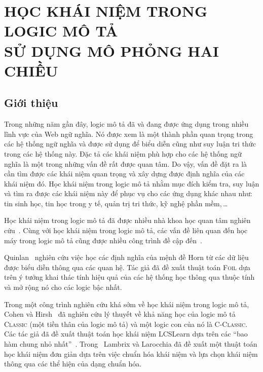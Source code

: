 \chapter[Học khái niệm trong logic mô tả sử dụng mô phỏng hai~chiều]{HỌC KHÁI NIỆM TRONG LOGIC MÔ TẢ\\SỬ DỤNG MÔ PHỎNG HAI CHIỀU} 
\label{Chapter3}
\thispagestyle{fancy}

\section{Giới thiệu}
\label{sec:Chap3.Introduction}
Trong những năm gần đây, logic mô tả đã và đang được ứng dụng trong nhiều lĩnh vực của Web ngữ nghĩa. Nó được xem là một thành phần quan trọng trong các hệ thống ngữ nghĩa và được sử dụng để biểu diễn cũng như suy luận tri thức trong các hệ thống này. Đặc tả các khái niệm phù hợp cho các hệ thống ngữ nghĩa là một trong những vấn đề rất được quan tâm. Do vậy, vấn đề đặt ra là cần tìm được các khái niệm quan trọng và xây dựng được định nghĩa của các khái niệm đó. Học khái niệm trong logic mô tả nhằm mục đích kiểm tra, suy luận và tìm ra được các khái niệm này để phục vụ cho các ứng dụng khác nhau như: tin sinh học, tin học trong y tế, quản trị tri thức, kỹ nghệ phần mềm,\,\ldots

Học khái niệm trong logic mô tả đã được nhiều nhà khoa học quan tâm nghiên cứu~\cite{Quinlan1990,Cohen1994,Lambrix1998,Badea2000,Iannone2007,Fanizzi2004,Fanizzi2008,Lehmann2007,Fanizzi2010,Lehmann2010,Nguyen2013}. Cùng với học khái niệm trong logic mô tả, các vấn đề liên quan đến học máy trong logic mô tả cũng được nhiều công trình đề cập đến~\cite{Alvarez2000,Kietz2003,Revoredo2010,Konstantopoulos2010,Distel2011,Lisi2012,Lisi2012B,Lisi2013,Ma2013}.

Quinlan~\cite{Quinlan1990} nghiên cứu việc học các định nghĩa của mệnh đề Horn từ các dữ liệu được biểu diễn thông qua các quan hệ. Tác giả đã đề xuất thuật toán \textsc{Foil} dựa trên ý tưởng khai thác tính hiệu quả của các hệ thống học thông qua thuộc tính và mở rộng nó cho các logic bậc nhất.

Trong một công trình nghiên cứu khá sớm về học khái niệm trong logic mô tả, Cohen và Hirsh~\cite{Cohen1994} đã nghiên cứu lý thuyết về khả năng học của logic mô tả \textsc{Classic} (một tiền thân của logic mô tả) và một logic con của nó là \textsc{C-Classic}. Các tác giả đã đề xuất thuật toán học khái niệm LCSLearn dựa trên các ``bao hàm chung nhỏ nhất''~\cite{Cohen1992}. 
%
Trong~\cite{Lambrix1998} Lambrix và Larocchia đã đề xuất một thuật toán học khái niệm đơn giản dựa trên việc chuẩn hóa khái niệm và lựa chọn khái niệm thông qua các thể hiện của dạng chuẩn hóa. 

